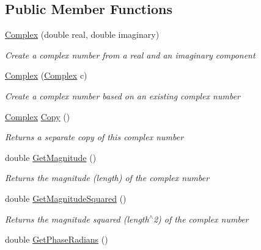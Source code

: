 \subsection*{Public Member Functions}
\begin{DoxyCompactItemize}
\item 
\mbox{\hyperlink{struct_c_s_i_1_1_library_1_1_data_types_1_1_complex_ac933a0bb6a12af69c7408324e93b1014}{Complex}} (double real, double imaginary)
\begin{DoxyCompactList}\small\item\em Create a complex number from a real and an imaginary component \end{DoxyCompactList}\item 
\mbox{\hyperlink{struct_c_s_i_1_1_library_1_1_data_types_1_1_complex_a608b9e584979c9471c92e5ec455669a0}{Complex}} (\mbox{\hyperlink{struct_c_s_i_1_1_library_1_1_data_types_1_1_complex}{Complex}} c)
\begin{DoxyCompactList}\small\item\em Create a complex number based on an existing complex number \end{DoxyCompactList}\item 
\mbox{\hyperlink{struct_c_s_i_1_1_library_1_1_data_types_1_1_complex}{Complex}} \mbox{\hyperlink{struct_c_s_i_1_1_library_1_1_data_types_1_1_complex_acfabccfac87216495a13aa8bff5f1dd3}{Copy}} ()
\begin{DoxyCompactList}\small\item\em Returns a separate copy of this complex number \end{DoxyCompactList}\item 
double \mbox{\hyperlink{struct_c_s_i_1_1_library_1_1_data_types_1_1_complex_a3ca835a74fdfc301ade249375e099138}{Get\+Magnitude}} ()
\begin{DoxyCompactList}\small\item\em Returns the magnitude (length) of the complex number \end{DoxyCompactList}\item 
double \mbox{\hyperlink{struct_c_s_i_1_1_library_1_1_data_types_1_1_complex_a829d8f3ada314bb10f43c3cc1365bb59}{Get\+Magnitude\+Squared}} ()
\begin{DoxyCompactList}\small\item\em Returns the magnitude squared (length$^\wedge$2) of the complex number \end{DoxyCompactList}\item 
double \mbox{\hyperlink{struct_c_s_i_1_1_library_1_1_data_types_1_1_complex_a1149f7fbc2cecd84de8bdffc4cbf937a}{Get\+Phase\+Radians}} ()

\end{DoxyCompactItemize}

